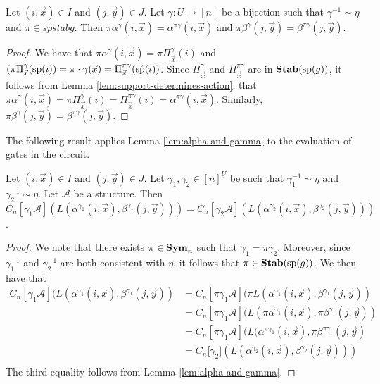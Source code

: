 \documentclass[../paper.tex]{subfiles}
\begin{document}
\begin{lem}
  \label{lem:alpha-and-gamma}
  Let $(i,\vec{x}) \in I$ and $(j, \vec{y}) \in J$. Let $\gamma: U \rightarrow
  [n]$ be a bijection such that $\gamma^{-1} \sim \eta$ and $\pi \in spstab{g}$.
  Then $\pi \alpha^{\gamma}(i, \vec{x}) = \alpha^{\pi \gamma}(i, \vec{x})$ and
  $\pi \beta^{\gamma}(j, \vec{y}) = \beta^{\pi \gamma}(j, \vec{y})$.
\end{lem}
\begin{proof}
  We have that $\pi \alpha^{\gamma}(i, \vec{x}) = \pi \Pi^{\gamma}_{\vec{x}}(i)$
  and $(\pi \Pi^{\gamma}_{\vec{x}}(\vec{\text{sp}}(i)) = \pi \cdot \gamma (\vec{x})
  = \Pi^{\pi \gamma}_{\vec{x}}(\vec{\text{sp}}(i))$. Since $\Pi^{\gamma}_{\vec{x}}$
  and $\Pi^{\pi \gamma}_{\vec{x}}$ are in $\text{\textbf{Stab}} (\text{sp} (g))$, it follows from Lemma
  \ref{lem:support-determines-action}, that $\pi \alpha^{\gamma}(i, \vec{x}) =
  \pi \Pi^{\gamma}_{\vec{x}} (i) = \Pi^{\pi \gamma}_{\vec{x}}(i) = \alpha^{\pi
    \gamma}(i, \vec{x})$. Similarly, $\pi \beta^{\gamma}(j, \vec{y}) =
  \beta^{\pi \gamma} (j, \vec{y})$.
\end{proof}

The following result applies Lemma \ref{lem:alpha-and-gamma} to the evaluation
of gates in the circuit.

\begin{lem}
  \label{lem:alpha-ind-gamma}
  Let $(i,\vec{x}) \in I$ and $(j, \vec{y}) \in J$. Let $\gamma_1, \gamma_2 \in
  [n]^{\underline{U}}$ be such that $\gamma^{-1}_1 \sim \eta$ and $\gamma^{-1}_2
  \sim \eta$. Let $\mathcal{A}$ be a structure. Then $C_n[\gamma_1 \mathcal{A}]
  (L(\alpha^{\gamma_1}(i, \vec{x}), \beta^{\gamma_1}(j, \vec{y}))) =
  C_n[\gamma_2 \mathcal{A}] (L(\alpha^{\gamma_2}(i, \vec{x}),
  \beta^{\gamma_2}(j, \vec{y})))$.
\end{lem}
\begin{proof}
  We note that there exists $\pi \in \text{\textbf{Sym}}_n$ such that $\gamma_1 = \pi
  \gamma_2$. Moreover, since $\gamma^{-1}_1$ and $\gamma^{-1}_2$ are both
  consistent with $\eta$, it follows that $\pi \in \text{\textbf{Stab}} (\text{sp} (g))$. We then have
  that
  \begin{align*}
    C_n[\gamma_1 \mathcal{A}](L(\alpha^{\gamma_1}(i, \vec{x}), \beta^{\gamma_1}(j,
    \vec{y})) &= C_n[\pi \gamma_1 \mathcal{A}](\pi L(\alpha^{\gamma_1}(i, \vec{x}),
                \beta^{\gamma_1}(j, \vec{y})) \\
              &= C_n[\pi \gamma_1 \mathcal{A}](L(\pi
                \alpha^{\gamma_1}(i, \vec{x}), \pi \beta^{\gamma_1}(j, \vec{y}))\\
              &= C_n[\pi
                \gamma_1 \mathcal{A}](L(\alpha^{\pi \gamma_1}(i, \vec{x}), \pi \beta^{\pi
                \gamma_1}(j, \vec{y})\\
              &= C_n[\gamma_2 \mathcal] (L(\alpha^{\gamma_2}(i,
                \vec{x}), \beta^{\gamma_2}(j, \vec{y})))\\
  \end{align*}The third equality follows from Lemma \ref{lem:alpha-and-gamma}.
\end{proof}
\end{document}
